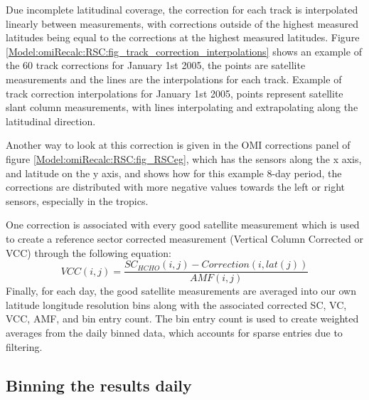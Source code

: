     Due incomplete latitudinal coverage, the correction for each track is interpolated linearly between measurements, with corrections outside of the highest measured latitudes being equal to the corrections at the highest measured latitudes.
    Figure \ref{Model:omiRecalc:RSC:fig_track_correction_interpolations} shows an example of the 60 track corrections for January 1st 2005, the points are satellite measurements and the lines are the interpolations for each track.
      {Example of track correction interpolations for January 1st 2005, points represent satellite slant column measurements, with lines interpolating and extrapolating along the latitudinal direction.}
      {\label{Model:omiRecalc:RSC:fig_track_correction_interpolations}}
    
    Another way to look at this correction is given in the OMI corrections panel of figure \ref{Model:omiRecalc:RSC:fig_RSCeg}, which has the sensors along the x axis, and latitude on the y axis, and shows how for this example 8-day period, the corrections are distributed with more negative values towards the left or right sensors, especially in the tropics.
    
    One correction is associated with every good satellite measurement which is used to create a reference sector corrected measurement (Vertical Column Corrected or VCC) through the following equation:
    \begin{equation}
    VCC(i,j) = \frac{SC_{HCHO}(i,j) - Correction(i,lat(j))}{AMF(i,j)}
    \end{equation}
    Finally, for each day, the good satellite measurements are averaged into our own latitude longitude resolution bins along with the associated corrected SC, VC, VCC, AMF, and bin entry count.
    The bin entry count is used to create weighted averages from the daily binned data, which accounts for sparse entries due to filtering.
  
  \subsection{Binning the results daily}
    
